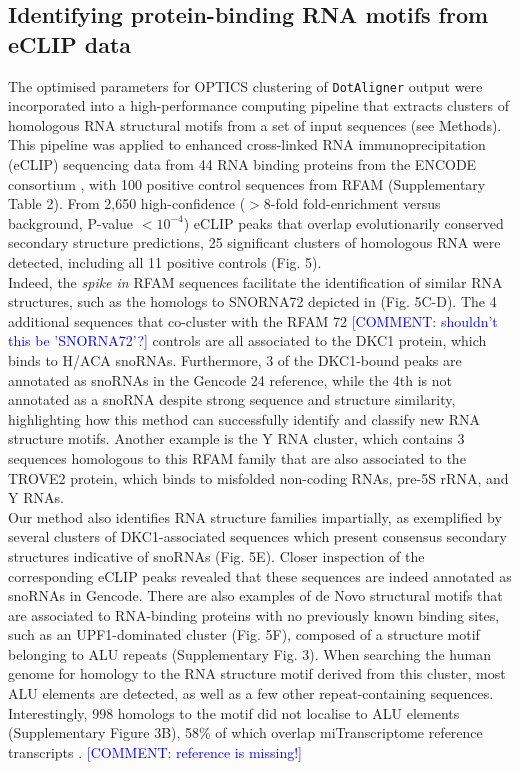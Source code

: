 \documentclass{bmcart}
\newcommand\dotaligner{\texttt{DotAligner}}
\begin{document}
\subsection*{Identifying protein-binding RNA motifs from eCLIP data}
The optimised parameters for OPTICS clustering of \dotaligner{} output were incorporated into 
a high-performance computing pipeline that extracts clusters of homologous RNA structural
 motifs from a set of input sequences (see Methods).  This pipeline was applied to enhanced cross-linked 
RNA immunoprecipitation (eCLIP) sequencing data from 44 RNA binding proteins from the ENCODE consortium  \cite{van2016robust}, with 100 positive control sequences from RFAM (Supplementary Table 2).
From 2,650 high-confidence ($>$8-fold  fold-enrichment versus background, P-value $<10^{-4}$) eCLIP peaks 
that overlap evolutionarily conserved secondary structure predictions, 
25 significant clusters of homologous RNA were detected, including all 11 positive controls (Fig. 5).\\

Indeed, the \textit{spike in} RFAM sequences facilitate the identification of similar RNA structures, 
such as the homologs to SNORNA72 depicted in (Fig. 5C-D). The 4 additional sequences that 
co-cluster with the RFAM 72 \textcolor{blue} {[COMMENT: shouldn't this be 'SNORNA72'?]} controls are all associated to the DKC1 protein, which binds to H/ACA snoRNAs. 
Furthermore, 3 of the DKC1-bound peaks are annotated as snoRNAs in the Gencode 24 reference, 
while the 4th is not annotated as a snoRNA despite strong sequence and structure similarity, 
highlighting how this method can successfully identify and classify new RNA structure motifs. 
Another example is the Y RNA cluster, which contains 3 sequences homologous to this RFAM family 
that are also associated to the TROVE2 protein, which binds to misfolded non-coding RNAs, 
pre-5S rRNA, and Y RNAs.\\

Our method also identifies RNA structure families impartially, 
as exemplified by several clusters of DKC1-associated sequences which present
consensus secondary structures indicative of snoRNAs (Fig. 5E). 
Closer inspection of the corresponding eCLIP peaks revealed that these sequences
are indeed annotated as snoRNAs in Gencode. There are also examples of de Novo 
structural motifs that are associated to RNA-binding proteins with no 
previously known binding sites, such as an UPF1-dominated cluster 
(Fig. 5F), composed of a structure motif belonging to ALU repeats 
(Supplementary Fig. 3). When searching the human genome for 
homology to the RNA structure motif derived from this cluster, 
most ALU elements are detected, as well as a few other repeat-containing sequences. 
Interestingly, 998 homologs to the motif did not localise to ALU elements (Supplementary Figure 3B), 
58\% of which overlap miTranscriptome reference transcripts \cite{iyer2015landscape}. \textcolor{blue} {[COMMENT: reference is missing!]} 
\end{document}
